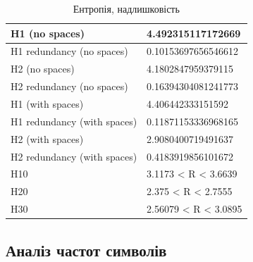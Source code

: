 \begin{table}[]
\centering
\caption{Ентропія, надлишковість}
\label{tab:my-table}
\begin{tabular}{ll}
\hline
\multicolumn{1}{|l|}{H1 (no spaces)}              & \multicolumn{1}{l|}{4.492315117172669}   \\ \hline
\multicolumn{1}{|l|}{H1 redundancy (no spaces)}   & \multicolumn{1}{l|}{0.10153697656546612} \\ \hline
\multicolumn{1}{|l|}{H2 (no spaces)}              & \multicolumn{1}{l|}{4.1802847959379115}  \\ \hline
\multicolumn{1}{|l|}{H2 redundancy (no spaces)}   & \multicolumn{1}{l|}{0.16394304081241773} \\ \hline
\multicolumn{1}{|l|}{H1 (with spaces)}            & \multicolumn{1}{l|}{4.406442333151592}   \\ \hline
\multicolumn{1}{|l|}{H1 redundancy (with spaces)} & \multicolumn{1}{l|}{0.11871153336968165} \\ \hline
\multicolumn{1}{|l|}{H2 (with spaces)}            & \multicolumn{1}{l|}{2.9080400719491637}  \\ \hline
\multicolumn{1}{|l|}{H2 redundancy (with spaces)} & \multicolumn{1}{l|}{0.4183919856101672}  \\ \hline
\multicolumn{1}{|l|}{H10}                         & \multicolumn{1}{l|}{3.1173 < R < 3.6639}  \\ \hline
\multicolumn{1}{|l|}{H20}                         & \multicolumn{1}{l|}{2.375 < R < 2.7555}  \\ \hline
\multicolumn{1}{|l|}{H30}                         & \multicolumn{1}{l|}{2.56079 < R < 3.0895}  \\ \hline
\end{tabular}
\end{table}


\subsection{Аналіз частот символів}

